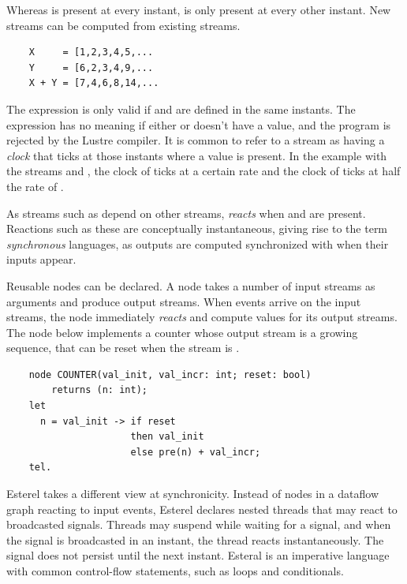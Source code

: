 Whereas  is present at every instant,  is only present at every other instant. New streams can be computed
from existing streams.

\begin{verbatim}
    X     = [1,2,3,4,5,...
    Y     = [6,2,3,4,9,...
    X + Y = [7,4,6,8,14,...
\end{verbatim}

The expression  is only valid if  and  are defined in the same instants. The expression
 has no meaning if either  or  doesn't have a value, and the program is rejected by the Lustre
compiler. It is common to refer to a stream as having a \textit{clock} that ticks at those instants where a value is
present. In the example with the streams  and , the clock of  ticks at a certain rate and
the clock of  ticks at half the rate of .

As streams such as  depend on other streams,  \textit{reacts} when  and  are
present. Reactions such as these are conceptually instantaneous, giving rise to the term \textit{synchronous} languages,
as outputs are computed synchronized with when their inputs appear.

Reusable nodes can be declared. A node takes a number of input streams as arguments and produce output streams. When events
arrive on the input streams, the node immediately \textit{reacts} and compute values for its output streams. The node below
implements a counter whose output stream is a growing sequence, that can be reset when the  stream is .

\begin{verbatim}
    node COUNTER(val_init, val_incr: int; reset: bool)
        returns (n: int);
    let
      n = val_init -> if reset
                      then val_init
                      else pre(n) + val_incr;
    tel.
\end{verbatim}

Esterel takes a different view at synchronicity. Instead of nodes in a dataflow graph reacting to input events, Esterel
declares nested threads that may react to broadcasted signals. Threads may suspend while waiting for a signal, and when
the signal is broadcasted in an instant, the thread reacts instantaneously. The signal does not persist until the next
instant. Esteral is an imperative language with common control-flow statements, such as loops and conditionals.

